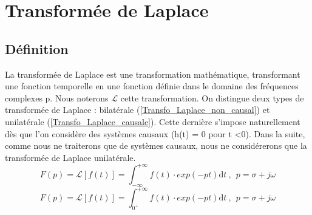 \documentclass[]{report}
\newcommand{\deriv}{\mathrm{d}}
\begin{document}
	\section{Transformée de Laplace}
	\subsection{Définition}
	La transformée de Laplace est une transformation mathématique, transformant une fonction temporelle en une fonction définie dans le domaine des fréquences complexes p. Nous noterons $\mathcal{L}$ cette transformation. On distingue deux types de transformée de Laplace : bilatérale (\ref{Transfo_Laplace_non_causal}) et unilatérale (\ref{Transfo_Laplace_causale}). Cette dernière s'impose naturellement dès que l'on considère des systèmes causaux (h(t) = 0 pour t <0). Dans la suite, comme nous ne traiterons que de systèmes causaux, nous ne considérerons que la transformée de Laplace unilatérale.
	\begin{equation}\label{Transfo_Laplace_non_causale}
	F(p) = \mathcal{L}[f(t)] = \int_{-\infty}^{+\infty} f(t) \cdot exp(-pt)	\deriv t~,~~p=\sigma + j \omega	
	\end{equation}
	\begin{equation}\label{Transfo_Laplace_causale}
	F(p) = \mathcal{L}[f(t)] = \int_{0^{+}}^{+\infty} f(t) \cdot exp(-pt)	\deriv t~,~~p=\sigma + j \omega	
	\end{equation}

	
\end{document}
